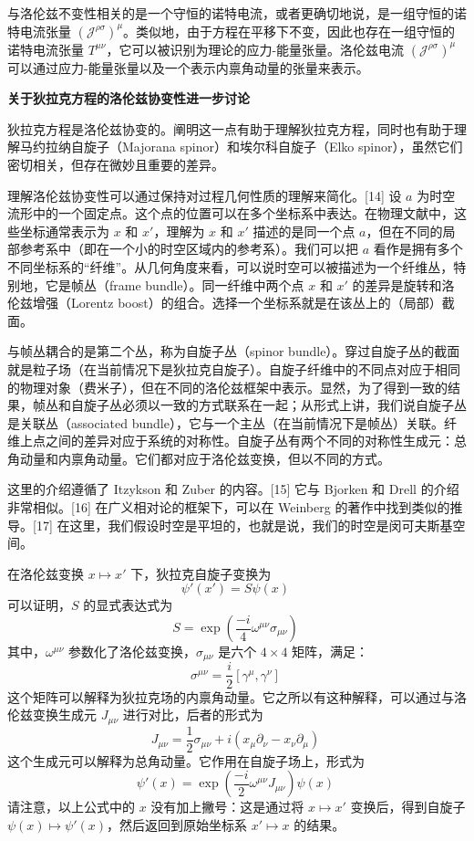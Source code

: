 与洛伦兹不变性相关的是一个守恒的诺特电流，或者更确切地说，是一组守恒的诺特电流张量 \( ({\mathcal {J}}^{\rho \sigma})^{\mu} \)。类似地，由于方程在平移下不变，因此也存在一组守恒的诺特电流张量 \( T^{\mu \nu} \)，它可以被识别为理论的应力-能量张量。洛伦兹电流 \( ({\mathcal {J}}^{\rho \sigma})^{\mu} \) 可以通过应力-能量张量以及一个表示内禀角动量的张量来表示。

\textbf{关于狄拉克方程的洛伦兹协变性进一步讨论}

狄拉克方程是洛伦兹协变的。阐明这一点有助于理解狄拉克方程，同时也有助于理解马约拉纳自旋子（Majorana spinor）和埃尔科自旋子（Elko spinor），虽然它们密切相关，但存在微妙且重要的差异。

理解洛伦兹协变性可以通过保持对过程几何性质的理解来简化。[14] 设 \( a \) 为时空流形中的一个固定点。这个点的位置可以在多个坐标系中表达。在物理文献中，这些坐标通常表示为 \( x \) 和 \( x' \)，理解为 \( x \) 和 \( x' \) 描述的是同一个点 \( a \)，但在不同的局部参考系中（即在一个小的时空区域内的参考系）。我们可以把 \( a \) 看作是拥有多个不同坐标系的“纤维”。从几何角度来看，可以说时空可以被描述为一个纤维丛，特别地，它是帧丛（frame bundle）。同一纤维中两个点 \( x \) 和 \( x' \) 的差异是旋转和洛伦兹增强（Lorentz boost）的组合。选择一个坐标系就是在该丛上的（局部）截面。

与帧丛耦合的是第二个丛，称为自旋子丛（spinor bundle）。穿过自旋子丛的截面就是粒子场（在当前情况下是狄拉克自旋子）。自旋子纤维中的不同点对应于相同的物理对象（费米子），但在不同的洛伦兹框架中表示。显然，为了得到一致的结果，帧丛和自旋子丛必须以一致的方式联系在一起；从形式上讲，我们说自旋子丛是关联丛（associated bundle），它与一个主丛（在当前情况下是帧丛）关联。纤维上点之间的差异对应于系统的对称性。自旋子丛有两个不同的对称性生成元：总角动量和内禀角动量。它们都对应于洛伦兹变换，但以不同的方式。

这里的介绍遵循了 Itzykson 和 Zuber 的内容。[15] 它与 Bjorken 和 Drell 的介绍非常相似。[16] 在广义相对论的框架下，可以在 Weinberg 的著作中找到类似的推导。[17] 在这里，我们假设时空是平坦的，也就是说，我们的时空是闵可夫斯基空间。

在洛伦兹变换 \( x \mapsto x' \) 下，狄拉克自旋子变换为  
\[
\psi'(x') = S \psi(x)~
\]  
可以证明，\( S \) 的显式表达式为  
\[
S = \exp \left( \frac{-i}{4} \omega^{\mu \nu} \sigma_{\mu \nu} \right)~
\]  
其中，\( \omega^{\mu \nu} \) 参数化了洛伦兹变换，\( \sigma_{\mu \nu} \) 是六个 \( 4 \times 4 \) 矩阵，满足：
\[
\sigma^{\mu \nu} = \frac{i}{2} [\gamma^\mu, \gamma^\nu]~
\]
这个矩阵可以解释为狄拉克场的内禀角动量。它之所以有这种解释，可以通过与洛伦兹变换生成元 \( J_{\mu \nu} \) 进行对比，后者的形式为  
\[
J_{\mu \nu} = \frac{1}{2} \sigma_{\mu \nu} + i \left( x_\mu \partial_\nu - x_\nu \partial_\mu \right)~
\]  
这个生成元可以解释为总角动量。它作用在自旋子场上，形式为  
\[
\psi'(x) = \exp \left( \frac{-i}{2} \omega^{\mu \nu} J_{\mu \nu} \right) \psi(x)~
\]  
请注意，以上公式中的 \( x \) 没有加上撇号：这是通过将 \( x \mapsto x' \) 变换后，得到自旋子 \( \psi(x) \mapsto \psi'(x) \)，然后返回到原始坐标系 \( x' \mapsto x \) 的结果。

